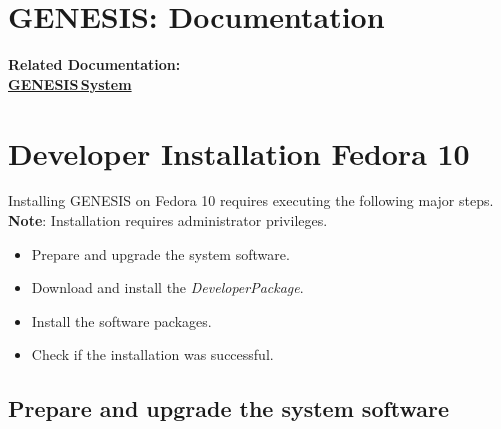 \documentclass[12pt]{article}
\begin{document}
\section*{GENESIS: Documentation}

{\bf Related Documentation:} \\
\href{../genesis-system/genesis-system.tex}{\bf GENESIS\,System}

\section*{Developer Installation Fedora 10}

Installing GENESIS on Fedora 10 requires executing the following major steps. {\bf Note}: Installation requires administrator privileges.
\begin{itemize}
   \item[] Prepare and upgrade the system software.
   \item[] Download and install the {\it DeveloperPackage}.
   \item[] Install the software packages.
   \item[] Check if the installation was successful. 
\end{itemize}

\subsection*{Prepare and upgrade the system software}
\end{document}
